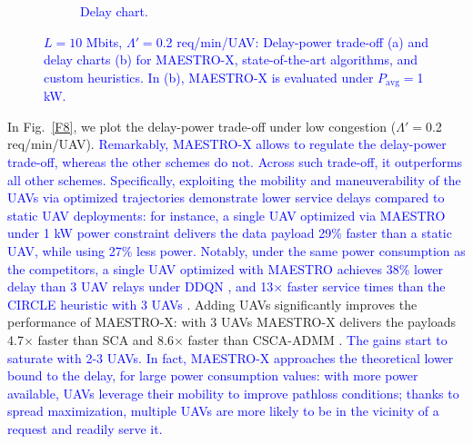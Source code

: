 \documentclass[12pt, draftcls, onecolumn]{IEEEtran}
\theoremstyle{plain}
\theoremstyle{definition}
\theoremstyle{remark}
\newcommand\hlt[1]{\textcolor{blue}{#1}}
\begin{document}
\begin{figure} [t]
\begin{subfigure}{0.433\linewidth}
         \caption{\hlt{Delay chart.}}
         \label{F9}
     \end{subfigure}
     \vspace{-2mm}
     \caption{\hlt{$L{=}10$ Mbits, $\Lambda'{=}$0.2 req/min/UAV: Delay-power trade-off (a) and delay charts (b) for MAESTRO-X, state-of-the-art algorithms, and custom heuristics. In (b), MAESTRO-X is evaluated under $P_{\mathrm{avg}}=$1 kW.}}
     \label{F8F9}
\end{figure}

In Fig.~\ref{F8}, we plot the delay-power trade-off under low congestion ($\Lambda'{=}$0.2 req/min/UAV).
\hlt{Remarkably, MAESTRO-X allows to regulate the delay-power trade-off, whereas the other schemes do not.
Across such trade-off, it outperforms all other schemes.}
\hlt{Specifically,
exploiting the mobility and maneuverability of the UAVs via optimized trajectories demonstrate lower service delays compared to static UAV deployments: for instance, a single UAV optimized via MAESTRO under 1 kW power constraint delivers the data payload 29\% faster than a static UAV, while using 27\% less power. 
Notably, under the same power consumption as the competitors, a single UAV optimized with MAESTRO achieves 38\% lower delay than 3 UAV relays  under DDQN \cite{DDQN}, and 13$\times$ faster service times than the CIRCLE heuristic with 3 UAVs \cite{MEC-DDPG}}. 
Adding UAVs significantly improves the performance of MAESTRO-X: with 3 UAVs MAESTRO-X delivers the payloads 4.7${\times}$ faster than SCA \cite{SCA} and 8.6$\times$ faster than CSCA-ADMM \cite{CSCA-ADMM}.
\hlt{The  gains start to saturate with 2-3 UAVs. In fact,
MAESTRO-X approaches the theoretical lower bound to the delay, for large power consumption values:
with more power available, UAVs leverage their mobility to improve pathloss conditions;
 thanks to spread maximization, multiple UAVs are more likely to be in the vicinity of a request and readily serve it.}
\end{document}
